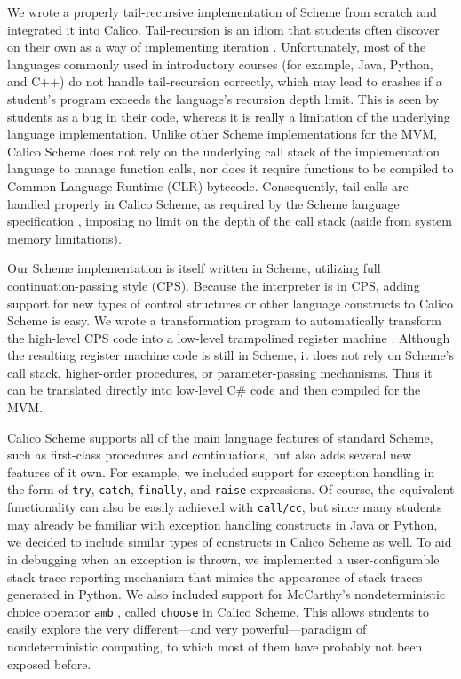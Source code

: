 \documentclass[preprint]{sigplanconf}
\begin{document}
We wrote a properly tail-recursive implementation of Scheme from
scratch and integrated it into Calico.  Tail-recursion is an idiom
that students often discover on their own as a way of implementing
iteration \cite{blank-kumar-2010}. Unfortunately, most of the
languages commonly used in introductory courses (for example, Java,
Python, and C++) do not handle tail-recursion correctly, which may
lead to crashes if a student's program exceeds the language's
recursion depth limit. This is seen by students as a bug in their
code, whereas it is really a limitation of the underlying language
implementation. Unlike other Scheme implementations for the MVM,
Calico Scheme does not rely on the underlying call stack of the
implementation language to manage function calls, nor does it require
functions to be compiled to Common Language Runtime (CLR)
bytecode. Consequently, tail calls are handled properly in Calico
Scheme, as required by the Scheme language specification
\cite{sperber-etal-2010}, imposing no limit on the depth of the call
stack (aside from system memory limitations).

Our Scheme implementation is itself written in Scheme, utilizing full
continuation-passing style (CPS).  Because the interpreter is in CPS, adding
support for new types of control structures or other language constructs to
Calico Scheme is easy.  We wrote a transformation program to automatically
transform the high-level CPS code into a low-level trampolined register machine
\cite{EOPL3}.  Although the resulting register machine code is still in Scheme,
it does not rely on Scheme's call stack, higher-order procedures, or
parameter-passing mechanisms.  Thus it can be translated directly into
low-level C\# code and then compiled for the MVM.
 
Calico Scheme supports all of the main language features of standard Scheme,
such as first-class procedures and continuations, but also adds several new
features of it own.  For example, we included support for exception handling in
the form of \texttt{try}, \texttt{catch}, \texttt{finally}, and \texttt{raise}
expressions.  Of course, the equivalent functionality can also be easily
achieved with \texttt{call/cc}, but since many students may already be familiar
with exception handling constructs in Java or Python, we decided to include
similar types of constructs in Calico Scheme as well.  To aid in debugging when
an exception is thrown, we implemented a user-configurable stack-trace
reporting mechanism that mimics the appearance of stack traces generated in
Python.  We also included support for McCarthy's nondeterministic choice
operator \texttt{amb} \cite{AMB}, called \texttt{choose} in Calico Scheme.
This allows students to easily explore the very different---and very
powerful---paradigm of nondeterministic computing, to which most of them have
probably not been exposed before.
\end{document}
